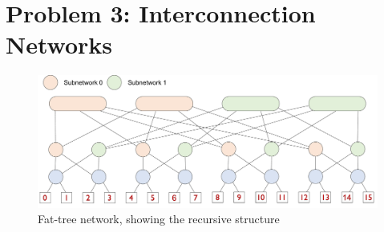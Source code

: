 \documentclass[11pt]{article}
\begin{document}
\section*{Problem 3: Interconnection Networks}

\begin{landscape}
\begin{figure}
\begin{center}
  \includegraphics[width=9in]{figs/fat-tree.pdf} %
\end{center}
\caption{Fat-tree network, showing the recursive structure}
\label{fig:fat-tree}
\end{figure}
\end{landscape}
\end{document}
